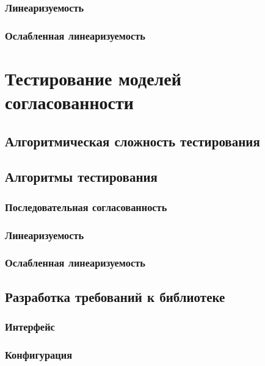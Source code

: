 \documentclass[14pt, openany]{book}
\begin{document}
\subsection{Линеаризуемость}

\subsection{Ослабленная линеаризуемость}

\chapter{Тестирование моделей согласованности}

\section{Алгоритмическая сложность тестирования}

\section{Алгоритмы тестирования}

\subsection{Последовательная согласованность}

\subsection{Линеаризуемость}

\subsection{Ослабленная линеаризуемость}

\section{Разработка требований к библиотеке}

\subsection{Интерфейс}

\subsection{Конфигурация}
\end{document}
